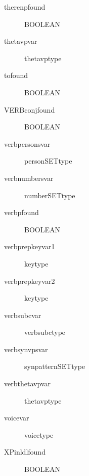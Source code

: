 \begin{description}
\item [therenpfound       ] BOOLEAN\\
\item [thetavpvar         ] thetavptype\\
\item [tofound            ] BOOLEAN\\
\item [VERBconjfound      ] BOOLEAN\\
\item [verbpersonsvar     ] personSETtype\\
\item [verbnumbersvar     ] numberSETtype\\
\item [verbpfound         ] BOOLEAN\\
\item [verbprepkeyvar1    ] keytype\\
\item [verbprepkeyvar2    ] keytype\\
\item [verbsubcvar        ] verbsubctype\\
\item [verbsynvpsvar      ] synpatternSETtype\\
\item [verbthetavpvar     ] thetavptype\\
\item [voicevar           ] voicetype\\
\item [XPinldlfound       ] BOOLEAN\\
\end{description}
